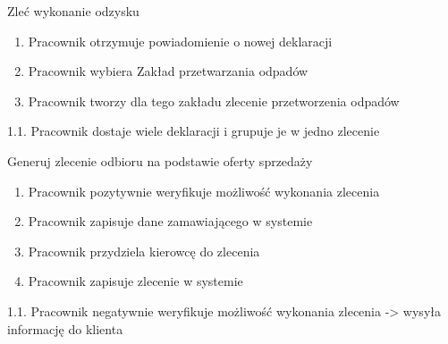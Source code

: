 	\begin{usecase}{Zleć wykonanie odzysku}
		\author{Dawid Suder} 
		\maketitle
\begin{scenario} 
			\begin{enumerate}
				\item Pracownik otrzymuje powiadomienie o nowej deklaracji
				\item Pracownik wybiera Zakład przetwarzania odpadów
				\item Pracownik tworzy dla tego zakładu zlecenie przetworzenia odpadów
			\end{enumerate}
		\end{scenario}
\begin{extensions}
				1.1. Pracownik dostaje wiele deklaracji i grupuje je w jedno zlecenie
	\end{extensions}
\end{usecase}

	\begin{usecase}{Generuj zlecenie odbioru na podstawie oferty sprzedaży}
		\author{Beata Obrok} 
		\maketitle
\begin{scenario} 
			\begin{enumerate}
				\item Pracownik pozytywnie weryfikuje możliwość wykonania zlecenia
				\item Pracownik zapisuje dane zamawiającego w systemie
				\item Pracownik przydziela kierowcę do zlecenia
				\item Pracownik zapisuje zlecenie w systemie
			\end{enumerate}
		\end{scenario}
\begin{extensions}
				1.1. Pracownik negatywnie weryfikuje możliwość wykonania zlecenia -> wysyła informację do klienta
	\end{extensions}
\end{usecase}

